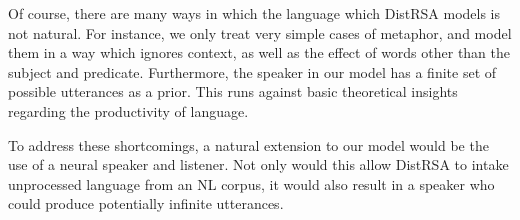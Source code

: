 \documentclass[10pt,letterpaper,twocolumn]{article}
\begin{document}
Of course, there are many ways in which the language which DistRSA models is not natural. For instance, we only treat very simple cases of metaphor, and model them in a way which ignores context, as well as the effect of words other than the subject and predicate. Furthermore, the speaker in our model has a finite set of possible utterances as a prior. This runs against basic theoretical insights regarding the productivity of language.

To address these shortcomings, a natural extension to our model would be the use of a neural speaker and listener. Not only would this allow DistRSA to intake unprocessed language from an NL corpus, it would also result in a speaker who could produce potentially infinite utterances. 

\printbibliography
\end{document}
